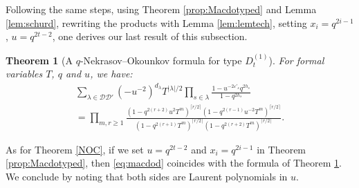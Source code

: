 \documentclass[11pt,letterpaper]{amsart}
\def\ccdd{\mathcal {DD}}
\newtheorem{thm}[df]{Theorem}
\numberwithin{equation}{section}
\numberwithin{df}{section}
\begin{document}
 
 Following the same steps, using Theorem \ref{prop:Macdotyped} and Lemma \ref{lem:schurd}, rewriting the products with Lemma \ref{lem:lemtech}, setting $x_i=q^{2i-1}$, $u=q^{2t-2}$, one derives our last result of this subsection.
\begin{thm}[A $q$-Nekrasov--Okounkov formula for type $D^{(1)}_{t}$]\label{NOd}
For formal variables $T$, $q$ and $u$, we have:
\begin{multline*}
\sum_{\lambda\in\ccdd'} (-u^{-2})^{d_\lambda}T^{\lvert \lambda\rvert/2}\prod_{s\in\lambda}\frac{1-u^{-2\varepsilon'_s}q^{2h_s}}{1-q^{2h_s}}
\\=
\prod_{m,r\geq 1}\frac{ \left(1-q^{2(r+2)}u^{2}T^m\right)^{\lceil r/2 \rceil}\left(1-q^{2(r-1)}u^{-2}T^m\right)^{\lceil r/2 \rceil}}{\left(1-q^{2(r+1)}T^m\right)^{\lceil r/2 \rceil}\left(1-q^{2(r+2)}T^m\right)^{\lceil r/2 \rceil}}.
%
\end{multline*}
\end{thm}

As for Theorem \ref{NOC}, if we set $u=q^{2t-2}$ and $x_i=q^{2i-1}$ in Theorem \ref{prop:Macdotyped}, then \eqref{eq:macdod} coincides with the formula of Theorem \ref{NOd}. We conclude by noting that both sides are Laurent polynomials in $u$.
\end{document}
